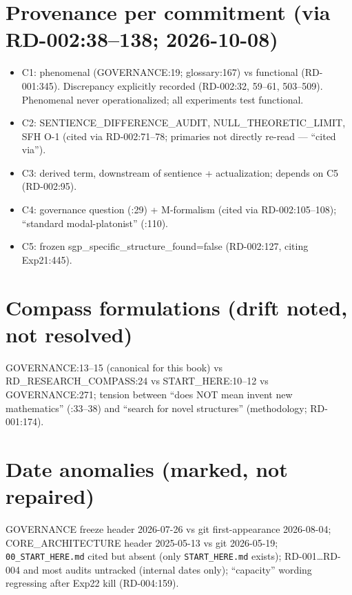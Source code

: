 \documentclass[
  11pt,
]{book}
\providecommand{\tightlist}{%
  \setlength{\itemsep}{0pt}\setlength{\parskip}{0pt}}
\begin{document}
\section{Provenance per commitment (via RD-002:38--138;
2026-10-08)}\label{provenance-per-commitment-via-rd-00238138-2026-10-08}

\begin{itemize}
\tightlist
\item
  C1: phenomenal (GOVERNANCE:19; glossary:167) vs functional
  (RD-001:345). Discrepancy explicitly recorded (RD-002:32, 59--61,
  503--509). Phenomenal never operationalized; all experiments test
  functional.
\item
  C2: SENTIENCE\_DIFFERENCE\_AUDIT, NULL\_THEORETIC\_LIMIT, SFH O-1
  (cited via RD-002:71--78; primaries not directly re-read --- ``cited
  via'').
\item
  C3: derived term, downstream of sentience + actualization; depends on
  C5 (RD-002:95).
\item
  C4: governance question (:29) + M-formalism (cited via
  RD-002:105--108); ``standard modal-platonist'' (:110).
\item
  C5: frozen sgp\_specific\_structure\_found=false (RD-002:127, citing
  Exp21:445).
\end{itemize}

\section{Compass formulations (drift noted, not
resolved)}\label{compass-formulations-drift-noted-not-resolved}

GOVERNANCE:13--15 (canonical for this book) vs RD\_RESEARCH\_COMPASS:24
vs START\_HERE:10--12 vs GOVERNANCE:271; tension between ``does NOT mean
invent new mathematics'' (:33--38) and ``search for novel structures''
(methodology; RD-001:174).

\section{Date anomalies (marked, not
repaired)}\label{date-anomalies-marked-not-repaired}

GOVERNANCE freeze header 2026-07-26 vs git first-appearance 2026-08-04;
CORE\_ARCHITECTURE header 2025-05-13 vs git 2026-05-19;
\texttt{00\_START\_HERE.md} cited but absent (only
\texttt{START\_HERE.md} exists); RD-001\ldots RD-004 and most audits
untracked (internal dates only); ``capacity'' wording regressing after
Exp22 kill (RD-004:159).
\end{document}
